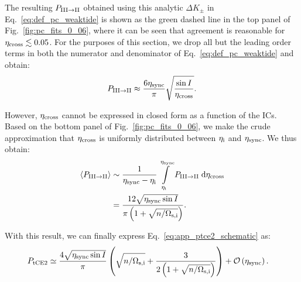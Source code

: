 \documentclass[
        fleqn,
        usenatbib,
    ]{mnras}
\newcommand*{\ev}[1]{\left\langle#1\right\rangle}
\newcommand*{\p}[1]{\left(#1\right)}
\begin{document}
The resulting $P_{\rm III \to II}$ obtained using this analytic $\Delta K_{\pm}$
in Eq.~\eqref{eq:def_pc_weaktide} is shown as the green dashed line in the top
panel of Fig.~\ref{fig:pc_fits_0_06}, where it can be seen that agreement is
reasonable for $\eta_{\rm cross} \lesssim 0.05$. For the purposes of this
section, we drop all but the leading order terms in both the numerator and
denominator of Eq.~\eqref{eq:def_pc_weaktide} and obtain:
\begin{equation}
    P_{\rm III \to II} \approx
        \frac{6\eta_{\rm sync}}{\pi} \sqrt{\frac{\sin I}{\eta_{\rm cross}}}.
\end{equation}

However, $\eta_{\rm cross}$ cannot be expressed in closed form as a function of
the ICs. Based on the bottom panel of Fig.~\ref{fig:pc_fits_0_06}, we make the
crude approximation that $\eta_{\rm cross}$ is uniformly distributed between
$\eta_{\rm i}$ and $\eta_{\rm sync}$. We thus obtain:
\begin{align}
    \ev{P_{\rm III \to II}}
        &\sim \frac{1}{\eta_{\rm sync} - \eta_{\rm i}}
            \int\limits_{\eta_{\rm i}}^{\eta_{\rm sync}}
            P_{\rm III \to II}\;\mathrm{d}\eta_{\rm cross}\nonumber\\
        &= \frac{12 \sqrt{\eta_{\rm sync}\sin I}}{\pi
            \p{1 + \sqrt{n / \Omega_{\rm s, i}}}}.
\end{align}

With this result, we can finally express Eq.~\eqref{eq:app_ptce2_schematic} as:
\begin{align}
    P_{\rm tCE2} &\simeq
            \frac{4\sqrt{\eta _{\rm sync} \sin I}}{\pi}\p{
                \sqrt{n / \Omega_{\rm s, i}}
                + \frac{3}{2\p{1
                + \sqrt{n / \Omega_{\rm s, i}}}}}
            + \mathcal{O}\p{\eta_{\rm sync}}.\label{eq:app_tce2_p_tot}
\end{align}

\label{lastpage} %
\end{document}
